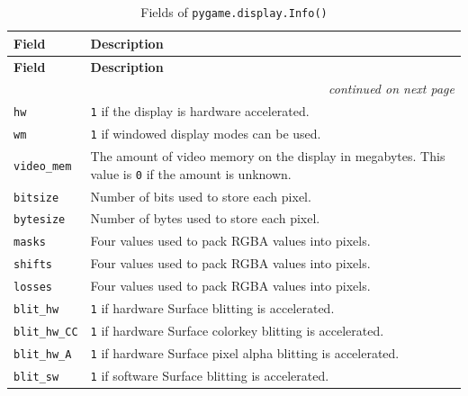 \begin{longtable}{p{4cm} p{10cm}}
	\caption{Fields of \texttt{pygame.display.Info()}}\label{tabDisplayInfo}\\
	\toprule
	\textbf{Field} & \textbf{Description} \\
	\midrule
	\endfirsthead
	
	\toprule
	\textbf{Field} & \textbf{Description} \\
	\midrule
	\endhead
	
	\midrule
	\multicolumn{2}{r}{\emph{continued on next page}} \\
	\endfoot
	
	\bottomrule
	\endlastfoot
	
	\texttt{hw} &
	\texttt{1} if the display is hardware accelerated. \\
	
	\texttt{wm} &
	\texttt{1} if windowed display modes can be used. \\
	
	\texttt{video\_mem} &
	The amount of video memory on the display in megabytes.
	This value is \texttt{0} if the amount is unknown. \\
	
	\texttt{bitsize} &
	Number of bits used to store each pixel. \\
	
	\texttt{bytesize} &
	Number of bytes used to store each pixel. \\
	
	\texttt{masks} &
	Four values used to pack RGBA values into pixels. \\
	
	\texttt{shifts} &
	Four values used to pack RGBA values into pixels. \\
	
	\texttt{losses} &
	Four values used to pack RGBA values into pixels. \\
	
	\texttt{blit\_hw} &
	\texttt{1} if hardware Surface blitting is accelerated. \\
	
	\texttt{blit\_hw\_CC} &
	\texttt{1} if hardware Surface colorkey blitting is accelerated. \\
	
	\texttt{blit\_hw\_A} &
	\texttt{1} if hardware Surface pixel alpha blitting is accelerated. \\
	
	\texttt{blit\_sw} &
	\texttt{1} if software Surface blitting is accelerated. \\
	

\end{longtable}
